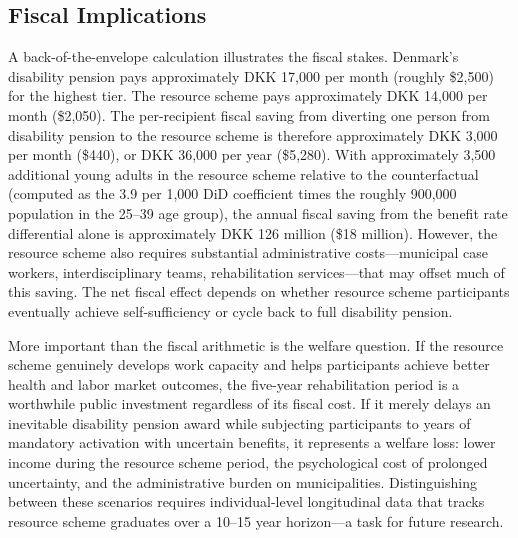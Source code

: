 \documentclass[12pt]{article}
\begin{document}
\subsection{Fiscal Implications}

A back-of-the-envelope calculation illustrates the fiscal stakes. Denmark's disability pension pays approximately DKK 17,000 per month (roughly \$2,500) for the highest tier. The resource scheme pays approximately DKK 14,000 per month (\$2,050). The per-recipient fiscal saving from diverting one person from disability pension to the resource scheme is therefore approximately DKK 3,000 per month (\$440), or DKK 36,000 per year (\$5,280). With approximately 3,500 additional young adults in the resource scheme relative to the counterfactual (computed as the 3.9 per 1,000 DiD coefficient times the roughly 900,000 population in the 25--39 age group), the annual fiscal saving from the benefit rate differential alone is approximately DKK 126 million (\$18 million). However, the resource scheme also requires substantial administrative costs---municipal case workers, interdisciplinary teams, rehabilitation services---that may offset much of this saving. The net fiscal effect depends on whether resource scheme participants eventually achieve self-sufficiency or cycle back to full disability pension.

More important than the fiscal arithmetic is the welfare question. If the resource scheme genuinely develops work capacity and helps participants achieve better health and labor market outcomes, the five-year rehabilitation period is a worthwhile public investment regardless of its fiscal cost. If it merely delays an inevitable disability pension award while subjecting participants to years of mandatory activation with uncertain benefits, it represents a welfare loss: lower income during the resource scheme period, the psychological cost of prolonged uncertainty, and the administrative burden on municipalities. Distinguishing between these scenarios requires individual-level longitudinal data that tracks resource scheme graduates over a 10--15 year horizon---a task for future research.
\end{document}
